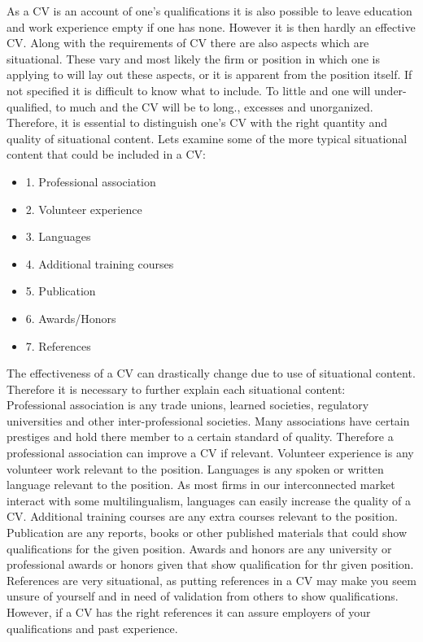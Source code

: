 As a CV is an account of one’s qualifications it is also possible to leave education and work experience empty if one has none.
However it is then hardly an effective CV.\cite{Difference_between_resume_and_curriculum_Vitae}
Along with the requirements of CV there are also aspects which are situational.
These vary and most likely the firm or position in which one is applying to will lay out these aspects, or it is apparent from the position itself.
If not specified it is difficult to know what to include. To little and one will under-qualified, to much and the CV will be to long.\cite{Job_Application_for_science}, excesses and unorganized.
Therefore, it is essential to distinguish one’s CV with the right quantity and quality of situational content.
Lets examine some of the more typical situational content that could be included in a CV: \\
\begin{itemize}
   \item 1. Professional association
   \item 2. Volunteer experience
   \item 3. Languages
   \item 4. Additional training courses
   \item 5. Publication
   \item 6. Awards/Honors
   \item 7. References\cite{6_sections} \\
\end{itemize}
The effectiveness of a CV can drastically change due to use of situational content.
Therefore it is necessary to further explain each situational content: \\
Professional association is any trade unions, learned societies, regulatory universities and other inter-professional societies.
Many associations have certain prestiges and hold there member to a certain standard of quality.
Therefore a professional association can improve a CV if relevant.\cite{Professional_associations_and_organizations}\cite{Perks_of_professional_organizations}
Volunteer experience is any volunteer work relevant to the position.
Languages is any spoken or written language relevant to the position.
As most firms in our interconnected market interact with some multilingualism, languages can easily increase the quality of a CV.
Additional training courses are any extra courses relevant to the position. 
Publication are any reports, books or other published materials that could show qualifications for the given position.
Awards and honors are any university or professional awards or honors given that show qualification for thr given position.
References are very situational, as putting references in a CV may make you seem unsure of yourself and in need of validation from others to show qualifications.
However, if a CV has the right references it can assure employers of your qualifications and past experience.\\

